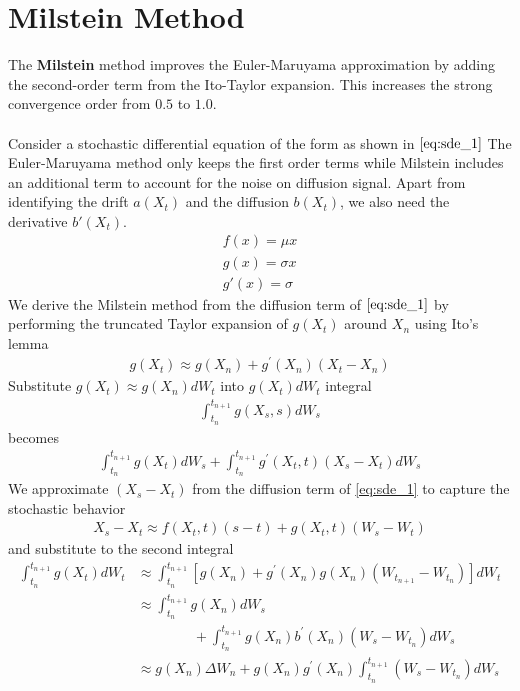 \section*{Milstein Method}
The \textbf{Milstein}\cite{wiki:milstein} method improves the Euler-Maruyama approximation by adding the second-order term from the Ito-Taylor expansion. This increases the strong convergence order from $0.5$ to $1.0$.
\\
\\
Consider a stochastic differential equation of the form as shown in $\eqref{eq:sde_1}$
The Euler-Maruyama method only keeps the first order terms while Milstein includes an additional term to account for the noise on diffusion signal. Apart from identifying the drift $a(X_t)$ and the diffusion $b(X_t)$, we also need the derivative $b'(X_t)$.
\begin{align*}
f(x) = \mu x\\
g(x) = \sigma x\\
g'(x) = \sigma
\end{align*}
We derive the Milstein method from the diffusion term of $\eqref{eq:sde_1}$ by performing the truncated Taylor expansion of $g(X_t)$ around $X_n$ using Ito's lemma
\begin{align*}
g(X_t) \approx g(X_n) + g^{'}(X_n)(X_t-X_n)
\end{align*}
Substitute $g(X_t)\approx g(X_n)dW_t$ into $g(X_t)dW_t$ integral
\begin{align*}
\int_{t_n}^{t_{n+1}}g(X_s,s)dW_s
\end{align*}
becomes
\begin{align*}
\int_{t_n}^{t_{n+1}} g(X_t)dW_s + \int_{t_n}^{t_{n+1}} g^{'}(X_t,t) (X_s - X_t)dW_s
\end{align*}
We approximate $(X_s - X_t)$ from the diffusion term of \eqref{eq:sde_1} to capture the stochastic behavior
\begin{align*}
X_s - X_t \approx f(X_t,t)(s-t) + g(X_t,t)(W_s-W_t)
\end{align*}
and substitute to the second integral
\begin{align*}
\int_{t_n}^{t_{n+1}} g(X_t)dW_t &\approx \int_{t_n}^{t_{n+1}}\left[g(X_n) + g^{'}(X_n) g(X_n)(W_{t_{n+1}}-W_{t_n})\right]dW_t\\
&\approx \int_{t_n}^{t_{n+1}} g(X_n) dW_s \\ 
&\qquad\qquad + \int_{t_n}^{t_{n+1}} g(X_n)b^{'}(X_n)(W_s-W_{t_n})dW_s\\
&\approx g(X_n) \Delta W_n + g(X_n)g^{'}(X_n) \int_{t_n}^{t_{n+1}} (W_{s} - W_{t_n}) dW_s
\end{align*}

